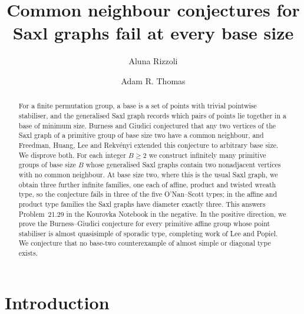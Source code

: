 \documentclass[a4paper,reqno,11pt]{amsart}
\numberwithin{equation}{section}
\begin{document}
\title[Common neighbour conjectures for Saxl graphs fail at every base size]{Common neighbour conjectures for Saxl graphs fail at every base size}

\author[Aluna Rizzoli]{Aluna Rizzoli}
\address{Department of Mathematics, King's College London, Strand, London WC2R 2LS, United Kingdom}
\address{Heilbronn Institute for Mathematical Research, Bristol, United Kingdom}

\author[Adam R. Thomas]{Adam R. Thomas}
\address{Warwick Mathematics Institute, University of Warwick, Coventry CV4 7AL, United Kingdom}


\begin{abstract} For a finite permutation group, a base is a set of points with trivial pointwise stabiliser, and the generalised Saxl graph records which pairs of points lie together in a base of minimum size. Burness and Giudici conjectured that any two vertices of the Saxl graph of a primitive group of base size two have a common neighbour, and Freedman, Huang, Lee and Rekv\'enyi extended this conjecture to arbitrary base size. We disprove both. For each integer $B\ge2$ we construct infinitely many primitive groups of base size $B$ whose generalised Saxl graphs contain two nonadjacent vertices with no common neighbour. At base size two, where this is the usual Saxl graph, we obtain three further infinite families, one each of affine, product and twisted wreath type, so the conjecture fails in three of the five O'Nan--Scott types; in the affine and product type families the Saxl graphs have diameter exactly three. This answers Problem~21.29 in the Kourovka Notebook in the negative. In the positive direction, we prove the Burness--Giudici conjecture for every primitive affine group whose point stabiliser is almost quasisimple of sporadic type, completing work of Lee and Popiel. We conjecture that no base-two counterexample of almost simple or diagonal type exists. \end{abstract}


\maketitle
\vspace{-26pt}

\section{Introduction}
\end{document}
